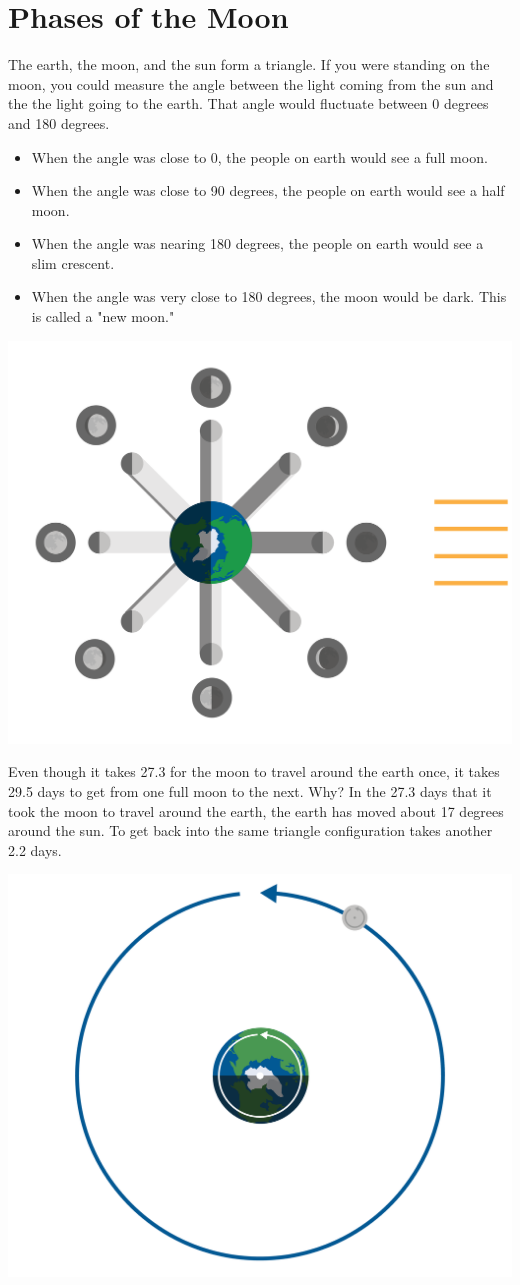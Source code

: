 \section{Phases of the Moon}

The earth, the moon, and the sun form a triangle.   If you were standing on the moon,  you could measure the angle between the light coming from the sun and the the light going to the earth.   That angle would fluctuate between 0 degrees and 180 degrees.  
\begin{itemize}
\item When the angle was close to 0,  the people on earth would see a full moon.  
\item When the angle was close to 90 degrees,  the people on earth would see a half moon. 
\item When the angle was nearing 180 degrees, the people on earth would see a slim crescent.
\item When the angle was very close to 180 degrees,  the moon would be dark.  This is called a "new moon." 
\end{itemize}

\includegraphics[width=.7\textwidth]{moonPhase.png}


Even though it takes 27.3 for the moon to travel around the earth once,   it takes 29.5 days to get from one full moon to the next. Why?  In the 27.3 days that it took the moon to travel around the earth,  the earth has moved about 17 degrees around the sun.  To get back into the same triangle configuration takes another 2.2 days.

\includegraphics[width=.7\textwidth]{earthmoon.png}

